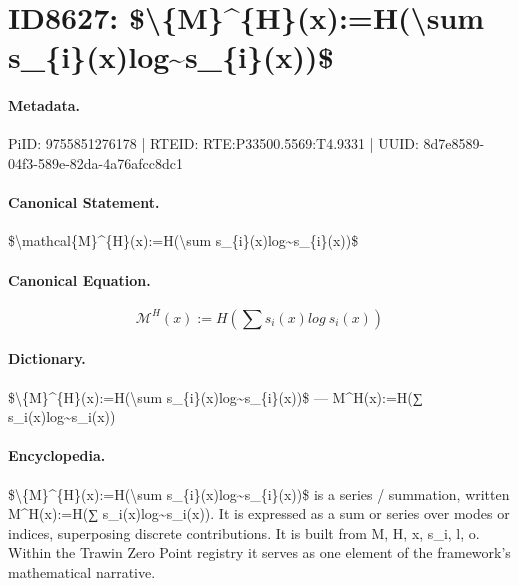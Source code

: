 \section*{ID8627: \$\textbackslash{}\{M\}\textasciicircum{}\{H\}(x):=H(\textbackslash{}sum s\_\{i\}(x)log\textasciitilde{}s\_\{i\}(x))\$}
\paragraph{Metadata.}
PiID: 9755851276178 | RTEID: RTE:P33500.5569:T4.9331 | UUID: 8d7e8589-04f3-589e-82da-4a76afcc8dc1

\paragraph{Canonical Statement.}
\$\textbackslash{}mathcal\{M\}\textasciicircum{}\{H\}(x):=H(\textbackslash{}sum s\_\{i\}(x)log\textasciitilde{}s\_\{i\}(x))\$

\paragraph{Canonical Equation.}
\[
\mathcal{M}^{H}(x):=H(\sum s_{i}(x)log~s_{i}(x))
\]

\paragraph{Dictionary.}
\$\textbackslash{}\{M\}\textasciicircum{}\{H\}(x):=H(\textbackslash{}sum s\_\{i\}(x)log\textasciitilde{}s\_\{i\}(x))\$ — M\textasciicircum{}H(x):=H(∑ s\_i(x)log\textasciitilde{}s\_i(x))

\paragraph{Encyclopedia.}
\$\textbackslash{}\{M\}\textasciicircum{}\{H\}(x):=H(\textbackslash{}sum s\_\{i\}(x)log\textasciitilde{}s\_\{i\}(x))\$ is a series / summation, written M\textasciicircum{}H(x):=H(∑ s\_i(x)log\textasciitilde{}s\_i(x)). It is expressed as a sum or series over modes or indices, superposing discrete contributions. It is built from M, H, x, s\_i, l, o. Within the Trawin Zero Point registry it serves as one element of the framework's mathematical narrative.
